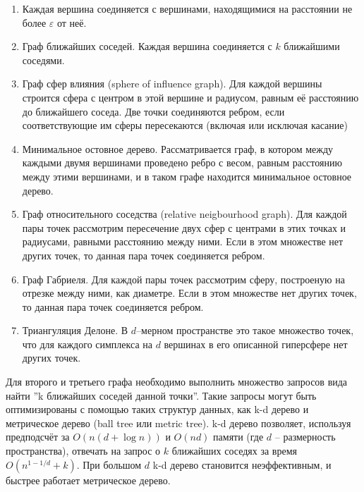 \documentclass{article}
\begin{document}
\begin{enumerate}

	\item Каждая вершина соединяется с вершинами, находящимися на расстоянии не более $\varepsilon$ от неё.
	
	\item Граф ближайших соседей. Каждая вершина соединяется с $k$ ближайшими соседями.
	
	\item Граф сфер влияния (sphere of influence graph). Для каждой вершины строится сфера с центром в этой вершине и радиусом, равным её расстоянию до ближайшего соседа. Две точки соединяются ребром, если соответствующие им сферы пересекаются (включая или исключая касание)
	
	\item Минимальное остовное дерево. Рассматривается граф, в котором между каждыми двумя вершинами проведено ребро с весом, равным расстоянию между этими вершинами, и в таком графе находится минимальное остовное дерево.
	
	\item Граф относительного соседства (relative neigbourhood graph). Для каждой пары точек рассмотрим пересечение двух сфер с центрами в этих точках и радиусами, равными расстоянию между ними. Если в этом множестве нет других точек, то данная пара точек соединяется ребром.
	
	\item Граф Габриеля. Для каждой пары точек рассмотрим сферу, построеную на отрезке между ними, как диаметре. Если в этом множестве нет других точек, то данная пара точек соединяется ребром.
	
	\item Триангуляция Делоне. В $d$--мерном пространстве это такое множество точек, что для каждого симплекса на $d$ вершинах в его описанной гиперсфере нет других точек.

\end{enumerate}

Для второго и третьего графа необходимо выполнить множество запросов вида найти ''k ближайших соседей данной точки''. Такие запросы могут быть оптимизированы с помощью таких структур данных, как k-d дерево и метрическое дерево (ball tree или metric tree). k-d дерево позволяет, используя предподсчёт за $O(n (d + \log n))$ и $O(n d)$ памяти (где $d$ -- размерность пространства), отвечать на запрос о $k$ ближайших соседях за время $O(n^{1-1/d} + k)$. При большом $d$ k-d дерево становится неэффективным, и быстрее работает метрическое дерево\cite{trees}.
\end{document}
